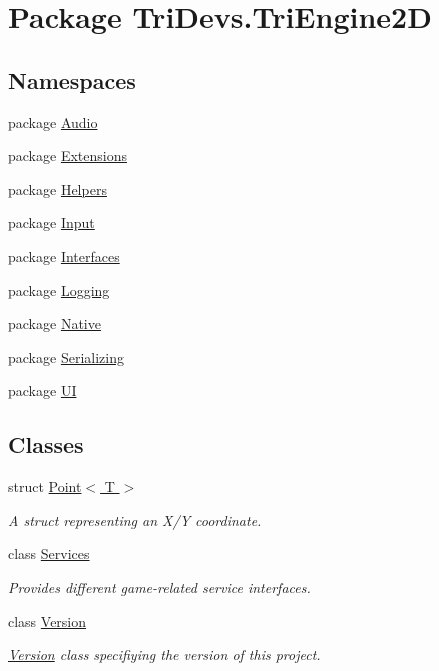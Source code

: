 \hypertarget{namespace_tri_devs_1_1_tri_engine2_d}{\section{Package Tri\-Devs.\-Tri\-Engine2\-D}
\label{namespace_tri_devs_1_1_tri_engine2_d}
}
\subsection*{Namespaces}
\begin{DoxyCompactItemize}
\item 
package \hyperlink{namespace_tri_devs_1_1_tri_engine2_d_1_1_audio}{Audio}
\item 
package \hyperlink{namespace_tri_devs_1_1_tri_engine2_d_1_1_extensions}{Extensions}
\item 
package \hyperlink{namespace_tri_devs_1_1_tri_engine2_d_1_1_helpers}{Helpers}
\item 
package \hyperlink{namespace_tri_devs_1_1_tri_engine2_d_1_1_input}{Input}
\item 
package \hyperlink{namespace_tri_devs_1_1_tri_engine2_d_1_1_interfaces}{Interfaces}
\item 
package \hyperlink{namespace_tri_devs_1_1_tri_engine2_d_1_1_logging}{Logging}
\item 
package \hyperlink{namespace_tri_devs_1_1_tri_engine2_d_1_1_native}{Native}
\item 
package \hyperlink{namespace_tri_devs_1_1_tri_engine2_d_1_1_serializing}{Serializing}
\item 
package \hyperlink{namespace_tri_devs_1_1_tri_engine2_d_1_1_u_i}{U\-I}
\end{DoxyCompactItemize}
\subsection*{Classes}
\begin{DoxyCompactItemize}
\item 
struct \hyperlink{struct_tri_devs_1_1_tri_engine2_d_1_1_point_3_01_t_01_4}{Point$<$ T $>$}
\begin{DoxyCompactList}\small\item\em A struct representing an X/\-Y coordinate. \end{DoxyCompactList}\item 
class \hyperlink{class_tri_devs_1_1_tri_engine2_d_1_1_services}{Services}
\begin{DoxyCompactList}\small\item\em Provides different game-\/related service interfaces. \end{DoxyCompactList}\item 
class \hyperlink{class_tri_devs_1_1_tri_engine2_d_1_1_version}{Version}
\begin{DoxyCompactList}\small\item\em \hyperlink{class_tri_devs_1_1_tri_engine2_d_1_1_version}{Version} class specifiying the version of this project. \end{DoxyCompactList}\end{DoxyCompactItemize}
